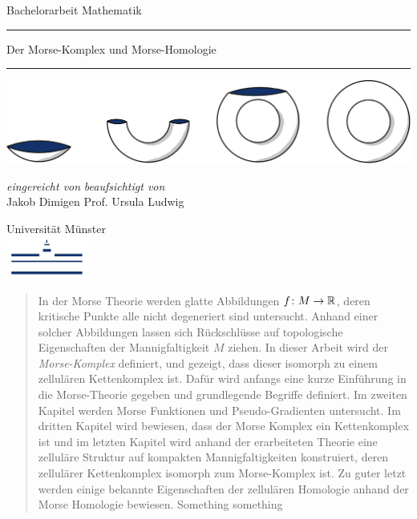 \documentclass[a4paper,12pt,twoside]{scrreport}
\begin{document}
\makeheaderempty

\begin{titlepage}
    \centering
    Bachelorarbeit Mathematik \\
    \color{DarkBlue}\rule{\linewidth}{1pt}
    \color{Black}\Huge Der Morse-Komplex und Morse-Homologie \\[14pt]
    \color{DarkBlue}\rule{\linewidth}{2pt}
    \color{Black}

    \vspace{3cm}
    \includegraphics[width=\textwidth]{../resources/Me-Titlepage-Color.jpeg}

    \vfill
    \small

    \textit{eingereicht von}
    \hfill
    \textit{beaufsichtigt von} \\
    Jakob Dimigen
    \hfill
    Prof. Ursula Ludwig

    \vspace{2cm}

    Universität Münster \\
    \vspace{0.02cm}
    \includegraphics[width=0.2\textwidth]{../resources/WWU_Logo.png}
\end{titlepage}

\tableofcontents

\begin{abstract}
    In der Morse Theorie werden glatte Abbildungen $f \colon M \to { \mathbb R }$, deren kritische Punkte 
    alle nicht degeneriert sind untersucht. Anhand einer solcher Abbildungen lassen sich
    Rückschlüsse auf topologische Eigenschaften der Mannigfaltigkeit $M$ ziehen. In dieser Arbeit
    wird der \textit{Morse-Komplex} definiert, und gezeigt, dass dieser isomorph zu einem zellulären 
    Kettenkomplex ist. Dafür wird anfangs eine kurze Einführung in die Morse-Theorie gegeben und 
    grundlegende Begriffe definiert. Im zweiten Kapitel werden Morse Funktionen und Pseudo-Gradienten 
    untersucht. Im dritten Kapitel wird bewiesen, dass der Morse Komplex ein Kettenkomplex ist und 
    im letzten Kapitel wird anhand der erarbeiteten Theorie eine zelluläre Struktur auf kompakten 
    Mannigfaltigkeiten konstruiert, deren zellulärer Kettenkomplex isomorph zum Morse-Komplex ist.
    Zu guter letzt werden einige bekannte Eigenschaften der zellulären Homologie anhand der 
    Morse Homologie bewiesen. Something something
\end{abstract}

\makeheaderfancy
\setcounter{page}{1}








\appendix




\eject
\end{document}
